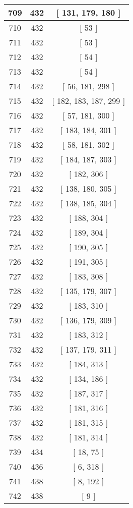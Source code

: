 \begin{center}
\begin{longtable}[H]{|| c c c ||}
\hline
709 & 432 & [ 131, 179, 180 ] \\ 
\hline
710 & 432 & [ 53 ] \\ 
\hline
711 & 432 & [ 53 ] \\ 
\hline
712 & 432 & [ 54 ] \\ 
\hline
713 & 432 & [ 54 ] \\ 
\hline
714 & 432 & [ 56, 181, 298 ] \\ 
\hline
715 & 432 & [ 182, 183, 187, 299 ] \\ 
\hline
716 & 432 & [ 57, 181, 300 ] \\ 
\hline
717 & 432 & [ 183, 184, 301 ] \\ 
\hline
718 & 432 & [ 58, 181, 302 ] \\ 
\hline
719 & 432 & [ 184, 187, 303 ] \\ 
\hline
720 & 432 & [ 182, 306 ] \\ 
\hline
721 & 432 & [ 138, 180, 305 ] \\ 
\hline
722 & 432 & [ 138, 185, 304 ] \\ 
\hline
723 & 432 & [ 188, 304 ] \\ 
\hline
724 & 432 & [ 189, 304 ] \\ 
\hline
725 & 432 & [ 190, 305 ] \\ 
\hline
726 & 432 & [ 191, 305 ] \\ 
\hline
727 & 432 & [ 183, 308 ] \\ 
\hline
728 & 432 & [ 135, 179, 307 ] \\ 
\hline
729 & 432 & [ 183, 310 ] \\ 
\hline
730 & 432 & [ 136, 179, 309 ] \\ 
\hline
731 & 432 & [ 183, 312 ] \\ 
\hline
732 & 432 & [ 137, 179, 311 ] \\ 
\hline
733 & 432 & [ 184, 313 ] \\ 
\hline
734 & 432 & [ 134, 186 ] \\ 
\hline
735 & 432 & [ 187, 317 ] \\ 
\hline
736 & 432 & [ 181, 316 ] \\ 
\hline
737 & 432 & [ 181, 315 ] \\ 
\hline
738 & 432 & [ 181, 314 ] \\ 
\hline
739 & 434 & [ 18, 75 ] \\ 
\hline
740 & 436 & [ 6, 318 ] \\ 
\hline
741 & 438 & [ 8, 192 ] \\ 
\hline
742 & 438 & [ 9 ] \\ 

\end{longtable}
\end{center}
